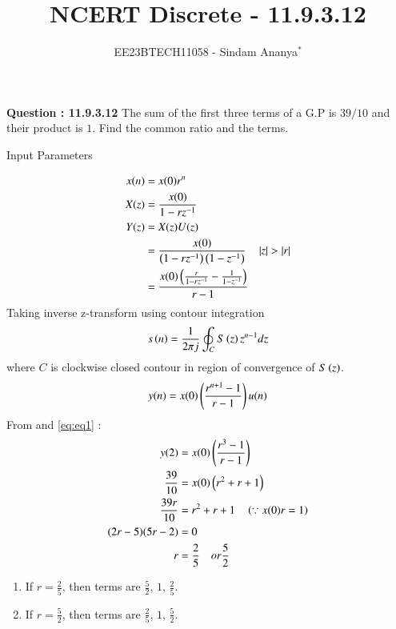 \documentclass[journal,12pt,twocolumn]{IEEEtran}
\theoremstyle{remark}
\begin{document}

\vspace{3cm}

\title{NCERT Discrete - 11.9.3.12}
\author{EE23BTECH11058 - Sindam Ananya$^{*}$%
}
\maketitle
\newpage
\bigskip

\renewcommand{\thefigure}{\theenumi}
\renewcommand{\thetable}{\theenumi}

\vspace{3cm}
\textbf{Question : 11.9.3.12} 
The sum of the first three terms of a G.P is $39/10$ and their product is $1$. Find the common ratio and the terms.\\
\solution
\begin{table}[h!]
    \centering
    
    \caption{Input Parameters}
    \label{tab:table1}
\end{table}
\begin{align}
x(n) &= x(0)r^n \\
X(z) &= \frac{x(0)}{1-rz^{-1}} \\
Y(z) &= X(z)U(z) \\
     &= \frac{x(0)}{\left(1-rz^{-1}\right)\left(1-z^{-1}\right)} \quad \left\vert z\right\vert > \left\vert r\right\vert \\
     &= \frac{x(0)\left(\frac{r}{1-rz^{-1}}-\frac{1}{1-z^{-1}}\right)}{r-1}
\end{align}
Taking inverse z-transform using contour integration
\begin{align}
s\left(n\right) = \frac{1}{2\pi j}\oint_CS\left(z\right)z^{n-1}dz
\end{align}
where $C$ is clockwise closed contour in region of convergence of $S\left(z\right)$.
\begin{equation}
y(n) = x(0)\left(\frac{r^{n+1}-1}{r-1}\right)u(n)
\label{eq:eq1}
\end{equation}
From  and \eqref{eq:eq1} :
\begin{align}
y(2) &= x(0)\left(\frac{r^3-1}{r-1}\right)\\
\frac{39}{10} &= x(0)\left(r^2+r+1\right)\\
\frac{39r}{10} &= r^2+r+1 \quad \left(\because x(0)r = 1\right)\\
(2r-5)(5r-2) &=0\\
r &= \frac{2}{5} \quad or \frac{5}{2}
\end{align}
\begin{enumerate}
      \item If $r = \frac{2}{5}$, then terms are $\frac{5}{2}$, $1$, $\frac{2}{5}$.
      \item If $r = \frac{5}{2}$, then terms are $\frac{2}{5}$, $1$, $\frac{5}{2}$.
\end{enumerate}
\end{document}
